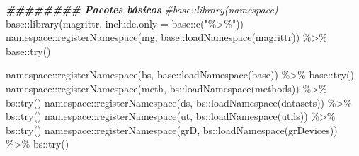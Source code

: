 \documentclass[
]{article}
\newenvironment{Shaded}{\begin{snugshade}}{\end{snugshade}}
\newcommand{\AttributeTok}[1]{\textcolor[rgb]{0.77,0.63,0.00}{#1}}
\newcommand{\CommentTok}[1]{\textcolor[rgb]{0.56,0.35,0.01}{\textit{#1}}}
\newcommand{\DocumentationTok}[1]{\textcolor[rgb]{0.56,0.35,0.01}{\textbf{\textit{#1}}}}
\newcommand{\FunctionTok}[1]{\textcolor[rgb]{0.00,0.00,0.00}{#1}}
\newcommand{\NormalTok}[1]{#1}
\newcommand{\SpecialCharTok}[1]{\textcolor[rgb]{0.00,0.00,0.00}{#1}}
\newcommand{\StringTok}[1]{\textcolor[rgb]{0.31,0.60,0.02}{#1}}
\begin{document}
\begin{Shaded}
\begin{Highlighting}[]
\DocumentationTok{\#\#\#\#\#\#\#\# Pacotes básicos}
\CommentTok{\#base::library(namespace)}
\NormalTok{base}\SpecialCharTok{::}\FunctionTok{library}\NormalTok{(magrittr, }\AttributeTok{include.only =}\NormalTok{ base}\SpecialCharTok{::}\FunctionTok{c}\NormalTok{(}\StringTok{"\%\textgreater{}\%"}\NormalTok{))}
\NormalTok{namespace}\SpecialCharTok{::}\FunctionTok{registerNamespace}\NormalTok{(}\StringTok{\textquotesingle{}mg\textquotesingle{}}\NormalTok{, base}\SpecialCharTok{::}\FunctionTok{loadNamespace}\NormalTok{(}\StringTok{\textquotesingle{}magrittr\textquotesingle{}}\NormalTok{)) }\SpecialCharTok{\%\textgreater{}\%}\NormalTok{ base}\SpecialCharTok{::}\FunctionTok{try}\NormalTok{()}

\NormalTok{namespace}\SpecialCharTok{::}\FunctionTok{registerNamespace}\NormalTok{(}\StringTok{\textquotesingle{}bs\textquotesingle{}}\NormalTok{, base}\SpecialCharTok{::}\FunctionTok{loadNamespace}\NormalTok{(}\StringTok{\textquotesingle{}base\textquotesingle{}}\NormalTok{)) }\SpecialCharTok{\%\textgreater{}\%}\NormalTok{ base}\SpecialCharTok{::}\FunctionTok{try}\NormalTok{()}
\NormalTok{namespace}\SpecialCharTok{::}\FunctionTok{registerNamespace}\NormalTok{(}\StringTok{\textquotesingle{}meth\textquotesingle{}}\NormalTok{, bs}\SpecialCharTok{::}\FunctionTok{loadNamespace}\NormalTok{(}\StringTok{\textquotesingle{}methods\textquotesingle{}}\NormalTok{)) }\SpecialCharTok{\%\textgreater{}\%}\NormalTok{ bs}\SpecialCharTok{::}\FunctionTok{try}\NormalTok{()}
\NormalTok{namespace}\SpecialCharTok{::}\FunctionTok{registerNamespace}\NormalTok{(}\StringTok{\textquotesingle{}ds\textquotesingle{}}\NormalTok{, bs}\SpecialCharTok{::}\FunctionTok{loadNamespace}\NormalTok{(}\StringTok{\textquotesingle{}datasets\textquotesingle{}}\NormalTok{)) }\SpecialCharTok{\%\textgreater{}\%}\NormalTok{ bs}\SpecialCharTok{::}\FunctionTok{try}\NormalTok{()}
\NormalTok{namespace}\SpecialCharTok{::}\FunctionTok{registerNamespace}\NormalTok{(}\StringTok{\textquotesingle{}ut\textquotesingle{}}\NormalTok{, bs}\SpecialCharTok{::}\FunctionTok{loadNamespace}\NormalTok{(}\StringTok{\textquotesingle{}utils\textquotesingle{}}\NormalTok{)) }\SpecialCharTok{\%\textgreater{}\%}\NormalTok{ bs}\SpecialCharTok{::}\FunctionTok{try}\NormalTok{()}
\NormalTok{namespace}\SpecialCharTok{::}\FunctionTok{registerNamespace}\NormalTok{(}\StringTok{\textquotesingle{}grD\textquotesingle{}}\NormalTok{, bs}\SpecialCharTok{::}\FunctionTok{loadNamespace}\NormalTok{(}\StringTok{\textquotesingle{}grDevices\textquotesingle{}}\NormalTok{)) }\SpecialCharTok{\%\textgreater{}\%}\NormalTok{ bs}\SpecialCharTok{::}\FunctionTok{try}\NormalTok{()}

\end{Highlighting}
\end{Shaded}
\end{document}
